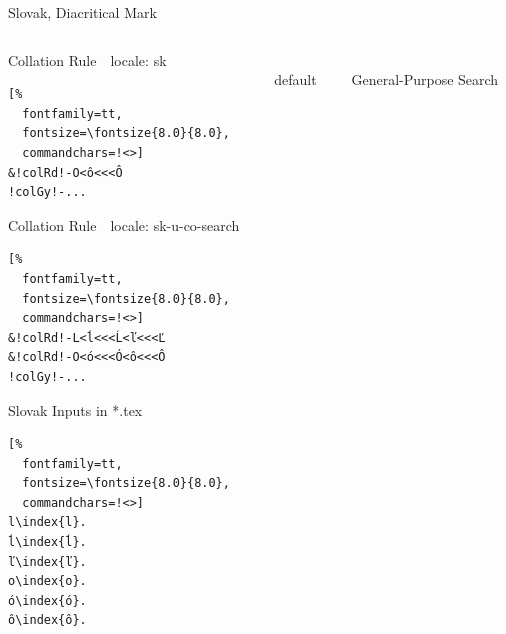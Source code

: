 \documentclass[aspectratio=169,10pt]{beamer}
\begin{document}
\begin{frame}[fragile]{Slovak, Diacritical Mark}

\begin{columns}
\begin{column}{55mm}

\setmonofont{Noto Sans Mono}
\begin{block}{Collation Rule~~\scriptsize locale: sk}
\begin{Verbatim}[%
  fontfamily=tt,
  fontsize=\fontsize{8.0}{8.0},
  commandchars=!<>]
&!colRd!-O<ô<<<Ô
!colGy!-...
\end{Verbatim}
\end{block}
\begin{block}{Collation Rule~~\scriptsize locale: sk-u-co-search}
\begin{Verbatim}[%
  fontfamily=tt,
  fontsize=\fontsize{8.0}{8.0},
  commandchars=!<>]
&!colRd!-L<ĺ<<<Ĺ<ľ<<<Ľ
&!colRd!-O<ó<<<Ó<ô<<<Ô
!colGy!-...
\end{Verbatim}
\end{block}
\begin{exampleblock}{Slovak Inputs in *.tex}
\begin{Verbatim}[%
  fontfamily=tt,
  fontsize=\fontsize{8.0}{8.0},
  commandchars=!<>]
l\index{l}.
ĺ\index{ĺ}.
ľ\index{ľ}.
o\index{o}.
ó\index{ó}.
ô\index{ô}.
\end{Verbatim}
\end{exampleblock}
\end{column}

\begin{column}{38mm}
\begin{center}
\\[2mm]%
default
\end{center}
\end{column}

\begin{column}{38mm}
\begin{center}
\\[2mm]%
General-Purpose Search
\end{center}
\end{column}
\end{columns}

\end{frame}

\end{document}
